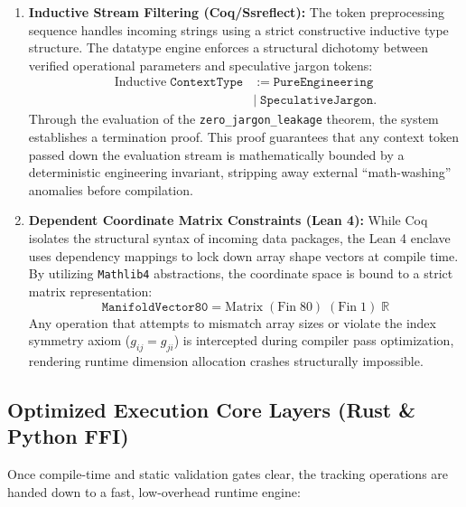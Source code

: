 \begin{enumerate}
    \item \textbf{Inductive Stream Filtering (Coq/Ssreflect):} The token preprocessing sequence handles incoming strings using a strict constructive inductive type structure. The datatype engine enforces a structural dichotomy between verified operational parameters and speculative jargon tokens:
    \begin{align*}
    \text{Inductive}\;\mathtt{ContextType} &:= \mathtt{PureEngineering} \\
                                           &|\;\mathtt{SpeculativeJargon}.
    \end{align*}
    Through the evaluation of the \texttt{zero\_jargon\_leakage} theorem, the system establishes a termination proof. This proof guarantees that any context token passed down the evaluation stream is mathematically bounded by a deterministic engineering invariant, stripping away external ``math-washing'' anomalies before compilation.
    
    \item \textbf{Dependent Coordinate Matrix Constraints (Lean 4):} While Coq isolates the structural syntax of incoming data packages, the Lean 4 enclave uses dependency mappings to lock down array shape vectors at compile time. By utilizing \texttt{Mathlib4} abstractions, the coordinate space is bound to a strict matrix representation:
    \[
    \mathtt{ManifoldVector80} = \text{Matrix}\;(\text{Fin}\;80)\;(\text{Fin}\;1)\;\mathbb{R}
    \]
    Any operation that attempts to mismatch array sizes or violate the index symmetry axiom ($g_{ij} = g_{ji}$) is intercepted during compiler pass optimization, rendering runtime dimension allocation crashes structurally impossible.
\end{enumerate}

\subsection{Optimized Execution Core Layers (Rust \& Python FFI)}

Once compile-time and static validation gates clear, the tracking operations are handed down to a fast, low-overhead runtime engine:

